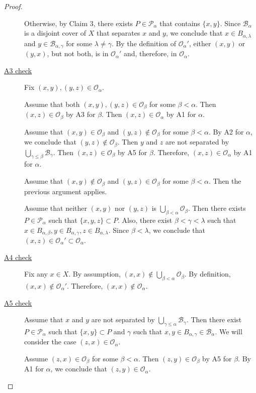 \documentclass[12pt]{amsart}
\begin{document}
\begin{proof}
\begin{description}
Otherwise, by Claim 3, there exists $P\in \mathcal P_\alpha$ that contains $\{x,y\}$. Since $\mathcal B_\alpha$ is a disjoint cover of $X$ that separates $x$ and $y$, we conclude that $x\in B_{\alpha,\lambda}$ and $y\in \mathcal B_{\alpha,\gamma}$ for some $\lambda\not=\gamma$. By the definition of $\mathcal O_\alpha'$, either $(x,y)$ or $(y,x)$, but not both,  is in $\mathcal O_\alpha'$ and, therefore, in $\mathcal O_\alpha$.
	\item[\underline{\rm A3 check}] Fix $(x,y),(y,z)\in \mathcal O_\alpha$.

Assume that  both $(x,y),(y,z)\in \mathcal O_\beta$ for some $\beta<\alpha$. Then $(x,z)\in \mathcal O_\beta$ by A3 for $\beta$. Then $(x,z)\in \mathcal O_\alpha$ by A1 for $\alpha$.

Assume that  $(x,y)\in \mathcal O_\beta $ and $(y,z)\not\in \mathcal O_\beta$ for some $\beta<\alpha$.  By A2 for $\alpha$, we conclude that $(y,z)\not\in \mathcal O_\beta$. Then $y$ and $z$ are not separated by 
$\bigcup_{\gamma\leq \beta}\mathcal B_\gamma$. Then $(x,z)\in \mathcal O_\beta$ by A5 for $\beta$. Therefore, $(x,z)\in \mathcal O_\alpha$ by A1 for $\alpha$.

Assume that  $(x,y)\not\in \mathcal O_\beta $ and $(y,z)\in \mathcal O_\beta$ for some $\beta<\alpha$. Then the previous argument applies. 

Assume that neither $(x,y)$ nor $(y,z)$ is $\bigcup_{\beta<\alpha}\mathcal O_\beta$. Then there exists $P\in \mathcal P_\alpha$ such that $\{x,y,z\}\subset P$. Also, there exist $\beta<\gamma<\lambda$ such that $x\in B_{\alpha,\beta},y\in B_{\alpha,\gamma},z\in B_{\alpha,\lambda}$. Since $\beta<\lambda$, we conclude that $(x,z)\in \mathcal O_\alpha'\subset \mathcal O_\alpha$.

	\item[\underline{\rm A4 check}] Fix any $x\in X$. By assumption, $(x,x)\not \in \bigcup_{\beta<\alpha}\mathcal O_\beta$. By definition, $(x,x)\not\in \mathcal O_\alpha'$. Therefore, $(x,x)\not\in \mathcal O_\alpha$.
	\item[\underline{\rm A5 check}] Assume that  $x$ and $y$ are not separated by  $\bigcup_{\gamma\leq \alpha}\mathcal B_\gamma$. Then there exist $P\in \mathcal P_\alpha$ such that $\{x,y\}\subset P$ and $\gamma$ such that 
$x,y\in B_{\alpha,\gamma}\in \mathcal B_\alpha$. We will consider the case $(z,x)\in \mathcal O_\alpha$.

Assume $(z,x)\in \mathcal O_\beta$ for some $\beta<\alpha$. Then $(z,y)\in \mathcal O_\beta$  by A5 for $\beta$. By A1 for $\alpha$, we conclude that $(z,y)\in \mathcal O_\alpha$.


\end{description}
\end{proof}
\end{document}

